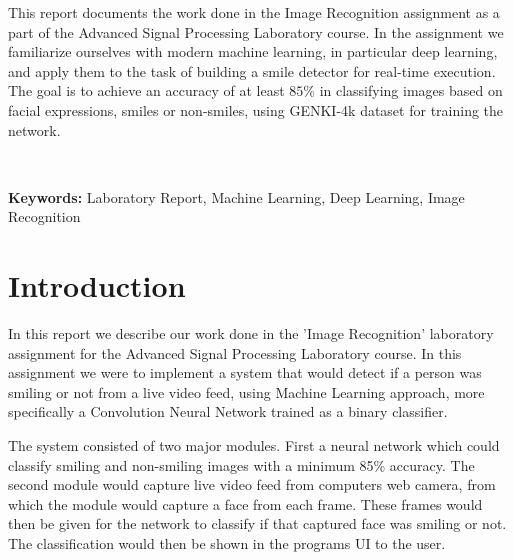 \documentclass[12pt,a4paper,english
]{tunithesis}
\begin{document}
\vspace{0.5cm}


\noindent
This report documents the work done in the Image Recognition assignment as a part of the Advanced Signal Processing Laboratory course. In the assignment we familiarize ourselves with modern machine learning, in particular deep learning, and apply them to the task of building a smile detector for real-time execution. The goal is to achieve an accuracy of at least $85 \%$ in classifying images based on facial expressions, smiles or non-smiles, using GENKI-4k dataset for training the network.


~

\noindent\textbf{Keywords:} Laboratory Report, Machine Learning, Deep Learning, Image Recognition




\setcounter{tocdepth}{3}              %
\tableofcontents                      %


\if@twoside
\cleardoublepage
\fi


\renewcommand{\chaptername}{} %


\chapter{Introduction}
\label{ch:intro}
In this report we describe our work done in the 'Image Recognition' laboratory assignment for the Advanced Signal Processing Laboratory course. In this assignment we were to implement a system that would detect if a person was smiling or not from a live video feed, using Machine Learning approach, more specifically a Convolution Neural Network trained as a binary classifier.

The system consisted of two major modules. First a neural network which could classify smiling and non-smiling images with a minimum 85\% accuracy. The second module would capture live video feed from computers web camera, from which the module would capture a face from each frame. These frames would then be given for the network to classify if that captured face was smiling or not. The classification would then be shown in the programs UI to the user.
\end{document}
